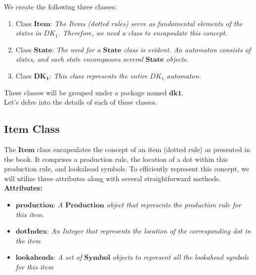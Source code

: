 We create the following three classes:
\begin{enumerate}
    \item Class \(\boldsymbol{Item}\): \textit{The Items (dotted rules) serve as fundamental elements of the states in \( DK_{1} \). Therefore, we need a class to encapsulate this concept.}
    \item Class \(\boldsymbol{State}\): \textit{The need for a \(\boldsymbol{State}\) class is evident. An automaton consists of states, and each state encompasses several \(\boldsymbol{State}\) objects.}
    \item Class \(\boldsymbol{DK_{1}}\): \textit{This class represents the entire \( DK_{1} \) automaton.}
\end{enumerate}

These classes will be grouped under a package named \(\boldsymbol{dk1}\).\\

Let’s delve into the details of each of these classes.

\subsection*{\(\boldsymbol{Item}\) Class}

The \(\boldsymbol{Item}\) class encapsulates the concept of an item (dotted rule) as presented in the book. It comprises a production rule, the location of a dot within this production rule, and lookahead symbols. To efficiently represent this concept, we will utilize three attributes along with several straightforward methods.\\

\textbf{Attributes:}
\begin{itemize}
    \item \(\boldsymbol{production}\): \textit{A \(\boldsymbol{Production}\) object that represents the production rule for this item.}
    \item \(\boldsymbol{dotIndex}\): \textit{An Integer that represents the location of the corresponding dot in the item}
    \item \(\boldsymbol{lookaheads}\): \textit{A set of \(\boldsymbol{Symbol}\) objects to represent all the lookahead symbols for this item}
\end{itemize}

